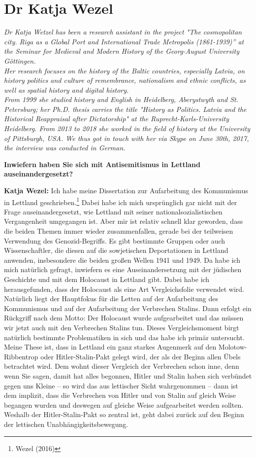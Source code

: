 \section{Dr Katja Wezel}

\textit{Dr Katja Wetzel has been a research assistant in the project "The cosmopolitan city. Riga as a Global Port and International Trade Metropolis (1861-1939)” at the Seminar for Medieval and Modern History of the Georg-August University Göttingen.\\
Her research focuses on the history of the Baltic countries, especially Latvia, on history politics and culture of remembrance, nationalism and ethnic conflicts, as well as spatial history and digital history.\\
From 1999 she studied history and English in Heidelberg, Aberystwyth and St. Petersburg; her Ph.D. thesis carries the title "History as Politics. Latvia and the Historical Reappraisal after Dictatorship" at the Ruprecht-Karls-University Heidelberg. From 2013 to 2018 she worked in the field of history at the University of Pittsburgh, USA. We thus got in touch with her via Skype on June 30th, 2017, the interview was conducted in German.}\par 
\vspace*{2em}
\textbf{Inwiefern haben Sie sich mit Antisemitismus in Lettland auseinandergesetzt?}

\textbf{Katja Wezel:} Ich habe meine Dissertation zur Aufarbeitung des Kommunismus in Lettland geschrieben.\footnote{Wezel (2016)} Dabei habe ich mich ursprünglich gar nicht mit der Frage auseinandergesetzt, wie Lettland mit seiner nationalsozialistischen Vergangenheit umgegangen ist. Aber mir ist relativ schnell klar geworden, dass die beiden Themen immer wieder zusammenfallen, gerade bei der teilweisen Verwendung des Genozid-Begriffs. Es gibt bestimmte Gruppen oder auch Wissenschaftler, die diesen auf die sowjetischen Deportationen in Lettland anwenden, insbesondere die beiden großen Wellen 1941 und 1949. Da habe ich mich natürlich gefragt, inwiefern es eine Auseinandersetzung mit der jüdischen Geschichte und mit dem Holocaust in Lettland gibt. Dabei habe ich herausgefunden, dass der Holocaust als eine Art Vergleichsfolie verwendet wird. Natürlich liegt der Hauptfokus für die Letten auf der Aufarbeitung des Kommunismus und auf der Aufarbeitung der Verbrechen Stalins. Dann erfolgt ein Rückgriff nach dem Motto: Der Holocaust wurde aufgearbeitet und das müssen wir jetzt auch mit den Verbrechen Stalins tun. Dieses Vergleichsmoment birgt natürlich bestimmte Problematiken in sich und das habe ich primär untersucht. Meine These ist, dass in Lettland ein ganz starkes Augenmerk auf den Molotow-Ribbentrop oder Hitler-Stalin-Pakt gelegt wird, der als der Beginn allen Übels betrachtet wird. Dem wohnt dieser Vergleich der Verbrechen schon inne, denn wenn Sie sagen, damit hat alles begonnen, Hitler und Stalin haben sich verbündet gegen uns Kleine – so wird das aus lettischer Sicht wahrgenommen – dann ist dem implizit, dass die Verbrechen von Hitler und von Stalin auf gleich Weise begangen wurden und deswegen auf gleiche Weise aufgearbeitet werden sollten. Weshalb der Hitler-Stalin-Pakt so zentral ist, geht dabei zurück auf den Beginn der lettischen Unabhängigkeitsbewegung. 

